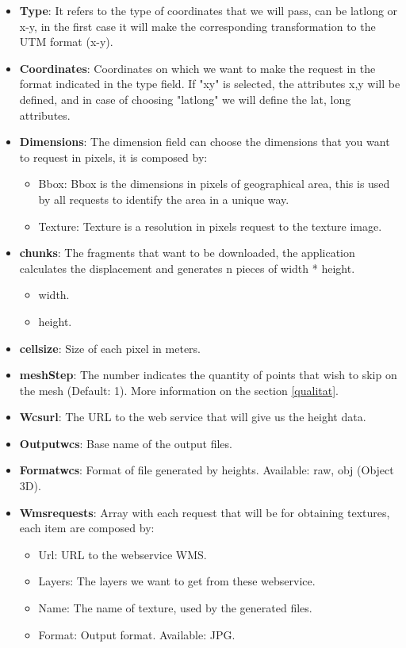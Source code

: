 \documentclass[10pt,a4paper,twocolumn,twoside]{article}
\begin{document}
\begin{itemize}
  \item \textbf{Type}: It refers to the type of coordinates that we will pass, can be latlong or x-y, in the first case it will make the corresponding transformation to the UTM format (x-y).
  
  \item \textbf{Coordinates}: Coordinates on which we want to make the request in the format indicated in the type field. If "xy" is selected, the attributes x,y will be defined, and in case of choosing "latlong" we will define the lat, long attributes.

  \item \textbf{Dimensions}: The dimension field can choose the dimensions that you want to request in pixels, it is composed by:
  
  \begin{itemize}
    \item Bbox: Bbox is the dimensions in pixels of geographical area, this is used by all requests to identify the area in a unique way.
    \item Texture: Texture is a resolution in pixels request to the texture image.
  \end{itemize}
  
  \item \textbf{chunks}: The fragments that want to be downloaded, the application calculates the displacement and generates n pieces of width * height.
  
  \begin{itemize}
    \item width.
    \item height.
  \end{itemize}

  \item \textbf{cellsize}: Size of each pixel in meters.
  \item \textbf{meshStep}: The number indicates the quantity of points that wish to skip on the mesh (Default: 1). More information on the section \ref{qualitat}.
  \item \textbf{Wcsurl}: The URL to the web service that will give us the height data.
  \item \textbf{Outputwcs}: Base name of the output files.
  \item \textbf{Formatwcs}: Format of file generated by heights. Available: raw, obj (Object 3D).

  \item \textbf{Wmsrequests}: Array with each request that will be for obtaining textures, each item are composed by:
  
  \begin{itemize}
    \item Url: URL to the webservice WMS.
    \item Layers: The layers we want to get from these webservice.
    \item Name: The name of texture, used by the generated files.
    \item Format: Output format. Available: JPG.
  \end{itemize}
  
\end{itemize}
\end{document}
